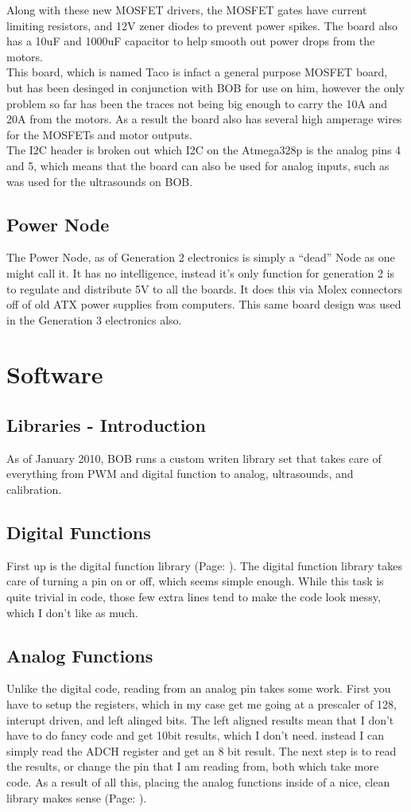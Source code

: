 \documentclass{article}
\begin{document}
Along with these new MOSFET drivers, the MOSFET gates have current limiting resistors, and 12V zener diodes to prevent power spikes. The board also has a 10uF and 1000uF capacitor to help smooth out power drops from the motors.\\
This board, which is named Taco is infact a general purpose MOSFET board, but has been desinged in conjunction with BOB for use on him, however the only problem so far has been the traces not being big enough to carry the 10A and 20A from the motors. As a result the board also has several high amperage wires for the MOSFETs and motor outputs.\\
The I2C header is broken out which I2C on the Atmega328p is the analog pins 4 and 5, which means that the board can also be used for analog inputs, such as was used for the ultrasounds on BOB.
\subsection{Power Node}
The Power Node, as of Generation 2 electronics is simply a “dead” Node as one might call it. It has no intelligence, instead it's only function for generation 2 is to regulate and distribute 5V to all the boards. It does this via Molex connectors off of old ATX power supplies from computers. This same board design was used in the Generation 3 electronics also.\\
\section{Software}
\subsection{Libraries - Introduction}
As of January 2010, BOB runs a custom writen library set that takes care of everything from PWM and digital function to analog, ultrasounds, and calibration.
\subsection{Digital Functions}
First up is the digital function library (Page: \pageref{digital}). The digital function library takes care of turning a pin on or off, which seems simple enough. While this task is quite trivial in code, those few extra lines tend to make the code look messy, which I don't like as much.\\
\subsection{Analog Functions}
Unlike the digital code, reading from an analog pin takes some work. First you have to setup the registers, which in my case get me going at a prescaler of 128, interupt driven, and left alinged bits. The left aligned results mean that I don't have to do fancy code and get 10bit results, which I don't need. instead I can simply read the ADCH register and get an 8 bit result. The next step is to read the results, or change the pin that I am reading from, both which take more code. As a result of all this, placing the analog functions inside of a nice, clean library makes sense (Page: \pageref{analog}).\\
\end{document}
